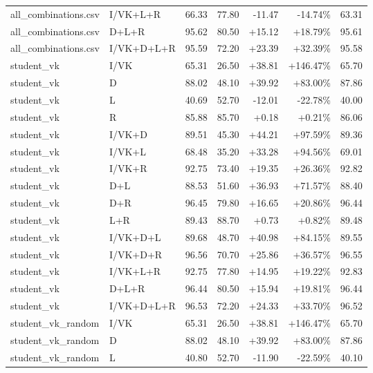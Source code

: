 \documentclass[UTF8,10pt,a4paper]{ctexart}
\newcommand{\better}[1]{\textcolor{ImpBlue}{#1}}
\newcommand{\worse}[1]{\textcolor{DropRed}{#1}}
\begin{document}
{\begin{longtable}{llrrrrr}
all\_combinations.csv & I/VK+L+R & 66.33 & 77.80 & \worse{-11.47} & \worse{-14.74\%} & 63.31\\
all\_combinations.csv & D+L+R & 95.62 & 80.50 & \better{+15.12} & \better{+18.79\%} & 95.61\\
all\_combinations.csv & I/VK+D+L+R & 95.59 & 72.20 & \better{+23.39} & \better{+32.39\%} & 95.58\\
student\_vk & I/VK & 65.31 & 26.50 & \better{+38.81} & \better{+146.47\%} & 65.70\\
student\_vk & D & 88.02 & 48.10 & \better{+39.92} & \better{+83.00\%} & 87.86\\
student\_vk & L & 40.69 & 52.70 & \worse{-12.01} & \worse{-22.78\%} & 40.00\\
student\_vk & R & 85.88 & 85.70 & \better{+0.18} & \better{+0.21\%} & 86.06\\
student\_vk & I/VK+D & 89.51 & 45.30 & \better{+44.21} & \better{+97.59\%} & 89.36\\
student\_vk & I/VK+L & 68.48 & 35.20 & \better{+33.28} & \better{+94.56\%} & 69.01\\
student\_vk & I/VK+R & 92.75 & 73.40 & \better{+19.35} & \better{+26.36\%} & 92.82\\
student\_vk & D+L & 88.53 & 51.60 & \better{+36.93} & \better{+71.57\%} & 88.40\\
student\_vk & D+R & 96.45 & 79.80 & \better{+16.65} & \better{+20.86\%} & 96.44\\
student\_vk & L+R & 89.43 & 88.70 & \better{+0.73} & \better{+0.82\%} & 89.48\\
student\_vk & I/VK+D+L & 89.68 & 48.70 & \better{+40.98} & \better{+84.15\%} & 89.55\\
student\_vk & I/VK+D+R & 96.56 & 70.70 & \better{+25.86} & \better{+36.57\%} & 96.55\\
student\_vk & I/VK+L+R & 92.75 & 77.80 & \better{+14.95} & \better{+19.22\%} & 92.83\\
student\_vk & D+L+R & 96.44 & 80.50 & \better{+15.94} & \better{+19.81\%} & 96.44\\
student\_vk & I/VK+D+L+R & 96.53 & 72.20 & \better{+24.33} & \better{+33.70\%} & 96.52\\
student\_vk\_random & I/VK & 65.31 & 26.50 & \better{+38.81} & \better{+146.47\%} & 65.70\\
student\_vk\_random & D & 88.02 & 48.10 & \better{+39.92} & \better{+83.00\%} & 87.86\\
student\_vk\_random & L & 40.80 & 52.70 & \worse{-11.90} & \worse{-22.59\%} & 40.10\\

\end{longtable}}
\end{document}
